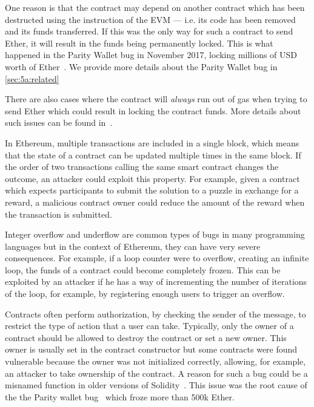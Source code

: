One reason is that the contract may depend on another contract which has been
destructed using the  instruction of the EVM --- i.e. its code has been removed and its funds transferred. If this was the only way for such a contract to send Ether, it will result in the funds being permanently locked. This is what happened in the Parity Wallet bug in November 2017, locking millions of USD worth of Ether~\cite{Breidenbach}. We provide more details about the Parity Wallet bug in \autoref{sec:5a:related}

There are also cases where the contract will \emph{always} run out of gas when trying
to send Ether which could result in locking the contract funds. More details about such issues can be found in~\cite{Grech2018}.

\point{\transactionorder~(\vto)}
In Ethereum, multiple transactions are included in a single block, which means that the state of a contract can be updated multiple times in the same block. If the order of two transactions calling the same smart contract changes the outcome, an attacker could exploit this property.
For example, given a contract which expects participants to submit the solution to a puzzle in exchange for a reward, a malicious contract owner could reduce the amount of the reward when the transaction is submitted.

\point{\integeroverflow~(\vio)}
Integer overflow and underflow are common types of bugs in many programming languages but in the context of Ethereum, they can have very severe consequences. For example, if a loop counter were to overflow, creating an infinite loop, the funds of a contract could become completely frozen. This can be exploited by an attacker if he has a way of incrementing the number of iterations of the loop, for example, by registering enough users to trigger an overflow.

\point{\unrestrictedaction~(\vua)}
Contracts often perform authorization, by checking the sender of the message, to restrict the type of action that a user can take.
Typically, only the owner of a contract should be allowed to destroy the contract or set a new owner.
This owner is usually set in the contract constructor but some contracts were found vulnerable because the owner was not initialized correctly, allowing, for example, an attacker to take ownership of the contract.
A reason for such a bug could be a misnamed function in older versions of Solidity~\cite{Brent2018,Krupp2018}.
This issue was the root cause of the the Parity wallet bug~\cite{Tsankov2018,Nikolic2018a} which froze more than 500k Ether.


